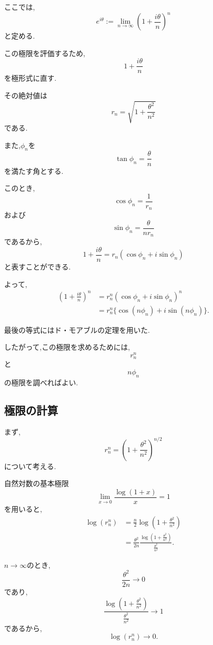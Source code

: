   ここでは,
  \[
    e^{i\theta}
    :=
    \lim_{n\to\infty}
    \left(
      1+\frac{i\theta}{n}
    \right)^n
  \]
  と定める.

  この極限を評価するため,
  \[
    1+\frac{i\theta}{n}
  \]
  を極形式に直す.

  その絶対値は
  \[
    r_n
    =
    \sqrt{
      1+\frac{\theta^2}{n^2}
    }
  \]
  である.

  また,$\phi_n$を
  \[
    \tan\phi_n
    =
    \frac{\theta}{n}
  \]
  を満たす角とする.

  このとき,
  \[
    \cos\phi_n
    =
    \frac{1}{r_n}
  \]
  および
  \[
    \sin\phi_n
    =
    \frac{\theta}{nr_n}
  \]
  であるから,
  \[
    1+\frac{i\theta}{n}
    =
    r_n(
      \cos\phi_n+i\sin\phi_n
    )
  \]
  と表すことができる.

  よって,
  \begin{align*}
    \left(
      1+\frac{i\theta}{n}
    \right)^n
    &=
    r_n^n
    (\cos\phi_n+i\sin\phi_n)^n\\
    &=
    r_n^n
    \{
      \cos(n\phi_n)
      +i\sin(n\phi_n)
    \}.
  \end{align*}

  最後の等式にはド・モアブルの定理を用いた.

  したがって,この極限を求めるためには,
  \[
    r_n^n
  \]
  と
  \[
    n\phi_n
  \]
  の極限を調べればよい.


\subsection{極限の計算}

  まず,
  \[
    r_n^n
    =
    \left(
      1+\frac{\theta^2}{n^2}
    \right)^{n/2}
  \]
  について考える.

  自然対数の基本極限
  \[
    \lim_{x\to0}
    \frac{\log(1+x)}{x}
    =
    1
  \]
  を用いると,
  \begin{align*}
    \log(r_n^n)
    &=
    \frac n2
    \log
    \left(
      1+\frac{\theta^2}{n^2}
    \right)\\
    &=
    \frac{\theta^2}{2n}
    \frac{
      \log
      \left(
        1+\frac{\theta^2}{n^2}
      \right)
    }{
      \frac{\theta^2}{n^2}
    }.
  \end{align*}

  $n\to\infty$のとき,
  \[
    \frac{\theta^2}{2n}\to0
  \]
  であり,
  \[
    \frac{
      \log
      \left(
        1+\frac{\theta^2}{n^2}
      \right)
    }{
      \frac{\theta^2}{n^2}
    }
    \to1
  \]
  であるから,
  \[
    \log(r_n^n)\to0.
  \]

